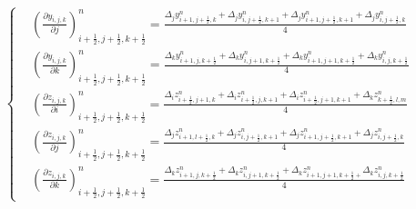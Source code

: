 \begin{enumerate}
\begin{eqnarray}
\begin{cases}
&(\frac{\partial y_{i,j,k}}{\partial j})^n_{i+\frac{1}{2},j+\frac{1}{2},k+\frac{1}{2}}=\frac{\Delta_j y^n_{i+1,j+\frac{1}{2},k}+\Delta_j y^n_{i,j+\frac{1}{2},k+1}+\Delta_j y^n_{i+1,j+\frac{1}{2},k+1}+\Delta_j y^n_{i,j+\frac{1}{2},k}}{4}\\
&(\frac{\partial y_{i,j,k}}{\partial k})^n_{i+\frac{1}{2},j+\frac{1}{2},k+\frac{1}{2}}=\frac{\Delta_k y^n_{i+1,j,k+\frac{1}{2}}+\Delta_k y^n_{i,j+1,k+\frac{1}{2}}+\Delta_k y^n_{i+1,j+1,k+\frac{1}{2}}+\Delta_k y^n_{i,j,k+\frac{1}{2}}}{4}\\
&(\frac{\partial z_{i,j,k}}{\partial i})^n_{i+\frac{1}{2},j+\frac{1}{2},k+\frac{1}{2}}=\frac{\Delta_i z^n_{i+\frac{1}{2},j+1,k}+\Delta_i z^n_{i+\frac{1}{2},j,k+1}+\Delta_i z^n_{i+\frac{1}{2},j+1,k+1}+\Delta_k z^n_{k+\frac{1}{2},l,m}}{4}\\
&(\frac{\partial z_{i,j,k}}{\partial j})^n_{i+\frac{1}{2},j+\frac{1}{2},k+\frac{1}{2}}=\frac{\Delta_j z^n_{i+1,l+\frac{1}{2},k}+\Delta_j z^n_{i,j+\frac{1}{2},k+1}+\Delta_j z^n_{i+1,j+\frac{1}{2},k+1}+\Delta_j z^n_{i,j+\frac{1}{2},k}}{4}\\
&(\frac{\partial z_{i,j,k}}{\partial k})^n_{i+\frac{1}{2},j+\frac{1}{2},k+\frac{1}{2}}=\frac{\Delta_k z^n_{i+1,j,k+\frac{1}{2}}+\Delta_k z^n_{i,j+1,k+\frac{1}{2}}+\Delta_k z^n_{i+1,j+1,k+\frac{1}{2}+}\Delta_k z^n_{i,j,k+\frac{1}{2}}}{4}
\end{cases}
\end{eqnarray}


\end{enumerate}
